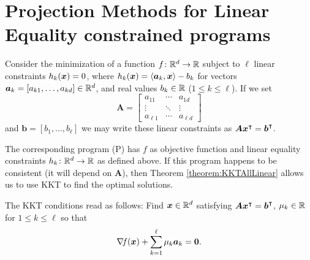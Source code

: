 
\section[Projection Methods]{Projection Methods for Linear Equality constrained programs}

Consider the minimization of a function $f\colon \mathbb{R}^d \to \mathbb{R}$ subject to $\ell$ linear constraints $h_k(\boldsymbol{x}) = 0$, where $h_k(\boldsymbol{x}) = \langle \boldsymbol{a}_k , \boldsymbol{x} \rangle - b_k$ for vectors $\boldsymbol{a}_k=[a_{k1}, \dotsc, a_{kd}] \in \mathbb{R}^d$, and real values $b_k \in \mathbb{R}$ ($1\leq k \leq \ell$).  If we set 
\begin{equation*}
\boldsymbol{A} = \begin{bmatrix} a_{11} & \dotsb & a_{1d} \\ \vdots & \ddots & \vdots \\ a_{\ell 1} & \dotsb & a_{\ell d} \end{bmatrix}
\end{equation*}
and $\boldsymbol{b} = [b_1, \dotsc, b_\ell]$ we may write these linear constraints as $\boldsymbol{A}{\boldsymbol{x}}^\intercal={\boldsymbol{b}}^\intercal$.

The corresponding program (P) has $f$ as objective function and linear equality constraints $h_k\colon \mathbb{R}^d \to \mathbb{R}$ as defined above.  If this program happens to be consistent (it will depend on $\boldsymbol{A}$), then Theorem \ref{theorem:KKTAllLinear} allows us to use KKT to find the optimal solutions. 

The KKT conditions read as follows: Find $\boldsymbol{x} \in \mathbb{R}^d$ satisfying $\boldsymbol{A}{\boldsymbol{x}}^\intercal = {\boldsymbol{b}}^\intercal$, $\mu_k \in \mathbb{R}$ for $1 \leq k \leq \ell$ so that
\begin{equation}\label{equation:KKTforLECP}
\mathop{\nabla\! {f}}(\boldsymbol{x}) + \sum_{k=1}^\ell \mu_k \boldsymbol{a}_k = \boldsymbol{0}.
\end{equation}


